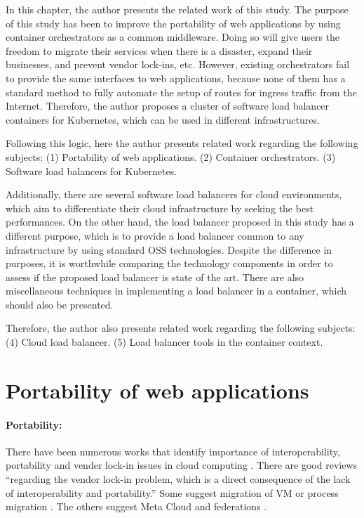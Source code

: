 
In this chapter, the author presents the related work of this study.
The purpose of this study has been to improve the portability of web applications by using container orchestrators as a common middleware.
Doing so will give users the freedom to migrate their services when there is a disaster, expand their businesses, and prevent vendor lock-ins, etc.
However, existing orchestrators fail to provide the same interfaces to web applications, because none of them has a standard method to fully automate the setup of routes for ingress traffic from the Internet.
Therefore, the author proposes a cluster of software load balancer containers for Kubernetes, which can be used in different infrastructures.

Following this logic, here the author presents related work regarding the following subjects:
(1) Portability of web applications.
(2) Container orchestrators.
(3) Software load balancers for Kubernetes.


Additionally, there are several software load balancers for cloud environments, which aim to differentiate their cloud infrastructure by seeking the best performances.
On the other hand, the load balancer proposed in this study has a different purpose, which is to provide a load balancer common to any infrastructure by using standard OSS technologies.
Despite the difference in purposes, it is worthwhile comparing the technology components in order to assess if the proposed load balancer is state of the art.
There are also miscellaneous techniques in implementing a load balancer in a container, which should also be presented.

Therefore, the author also presents related work regarding the following subjects:
(4) Cloud load balancer.
(5) Load balancer tools in the container context.

\section{Portability of web applications}

\paragraph{\bf Portability:}

There have been numerous works that identify importance of interoperability, portability and vender lock-in issues in cloud computing \cite{kratzke2016clouns,opara2014critical,opara2016critical,mansour2016interoperability,kaur2017interoperability,kaur2017interoperability,di2015cloud}.
There are good reviews \cite{kaur2017interoperability,petcu2014portability} \enquote{regarding the vendor lock-in problem, which is a direct consequence of the lack of interoperability and portability.}
Some suggest migration of VM or process migration \cite{}.
The others suggest Meta Cloud \cite{satzger2013winds} and federations \cite{K8sFederation2017}.

